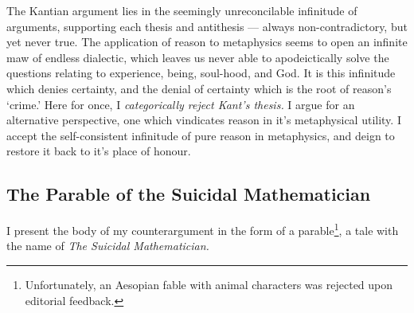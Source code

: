 \noindent
The Kantian argument lies in the seemingly unreconcilable infinitude of arguments, supporting each thesis and antithesis --- always non-contradictory, but yet never true. The application of reason to metaphysics seems to open an infinite maw of endless dialectic, which leaves us never able to apodeictically solve the questions relating to experience, being, soul-hood, and God. It is this infinitude which denies certainty, and the denial of certainty which is the root of reason's \enquote*{crime.} Here for once, I \emph{categorically reject Kant's thesis.} I argue for an alternative perspective, one which vindicates reason in it's metaphysical utility. I accept the self-consistent infinitude of pure reason in metaphysics, and deign to restore it back to it's place of honour.

\subsection{The Parable of the Suicidal Mathematician}

I present the body of my counterargument in the form of a parable\footnote{Unfortunately, an Aesopian fable with animal characters was rejected upon editorial feedback.}, a tale with the name of \emph{The Suicidal Mathematician.}

